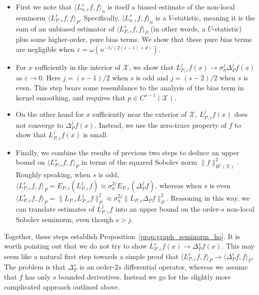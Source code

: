 \documentclass{article}
\newcommand{\1}{\mathbf{1}}
\newcommand{\mc}[1]{\mathcal{#1}}
\newcommand{\dotp}[2]{\langle #1, #2 \rangle}
\theoremstyle{alden}
\theoremstyle{aldenthm}
\theoremstyle{definition}
\theoremstyle{remark}
\begin{document}
\begin{itemize}
	\item First we note that $\dotp{L_{n,\varepsilon}^s f}{f}_n$ is itself a biased estimate of the non-local seminorm $\dotp{L_{P,\varepsilon}^sf}{f}_{P}$. Specifically, $\dotp{L_{n,\varepsilon}^s f}{f}_n$ is a $V$-statistic, meaning it is the sum of an unbiased estimator of $\dotp{L_{P,\varepsilon}^sf}{f}_{P}$ (in other words, a $U$-statistic) plus some higher-order, pure bias terms. We show that these pure bias terms are negligible when $\varepsilon = \omega(n^{-1/(2(s - 1) + d)})$. 
	\item For $x$ sufficiently in the interior of $\mc{X}$, we show that $L_{P,\varepsilon}^jf(x) \to \sigma_{\eta}^j \Delta_P^jf(x)$ as $\varepsilon \to 0$. Here $j = (s - 1)/2$ when $s$ is odd and $j = (s - 2)/2$ when $s$ is even. This step bears some resemblance to the analysis of the bias term in kernel smoothing, and requires that $p \in C^{s-1}(\mc{X})$.
	\item On the other hand for $x$ sufficiently near the exterior of $\mc{X}$, $L_{P,\varepsilon}^jf(x)$ does not converge to $\Delta_P^jf(x)$. Instead, we use the zero-trace property of $f$ to show that $L_{P,\varepsilon}^jf(x)$ is small.
	\item Finally, we combine the results of previous two steps to deduce an upper bound on $\dotp{L_{P,\varepsilon}^sf}{f}_{P}$ in terms of the squared Sobolev norm $\|f\|_{H^s(\mc{X})}^2$.  Roughly speaking, when $s$ is odd, $\dotp{L_{P,\varepsilon}^sf}{f}_P = E_{P,\varepsilon}(L_{P,\varepsilon}^jf) \approx \sigma_{\eta}^{2j}E_{P,\varepsilon}(\Delta_P^jf)$, whereas when $s$ is even $\dotp{L_{P,\varepsilon}^sf}{f}_P = \|L_{P,\varepsilon}L_{P,\varepsilon}^{j}f\|_{P}^2 \approx \sigma_{\eta}^{2j}\|L_{P,\varepsilon} \Delta_Pf\|_P^2$. Reasoning in this way, we can translate estimates of $L_{P,\varepsilon}^jf$ into an upper bound on the order-$s$ non-local Sobolev seminorm, even though $s > j$.
\end{itemize}
Together, these steps establish Proposition~\ref{prop:graph_seminorm_ho}. It is worth pointing out that we do not try to show $L_{P,\varepsilon}^sf(x) \to \Delta_{P}^sf(x)$. This may seem like a natural first step towards a simple proof that $\dotp{L_{P,\varepsilon}^sf}{f}_{P} \to \dotp{\Delta_P^sf}{f}_{P}$. The problem is that $\Delta_P^s$ is an order-$2s$ differential operator, whereas we assume that $f$ has only $s$ bounded derivatives. Instead we go for the slightly more complicated approach outlined above. 
\end{document}
